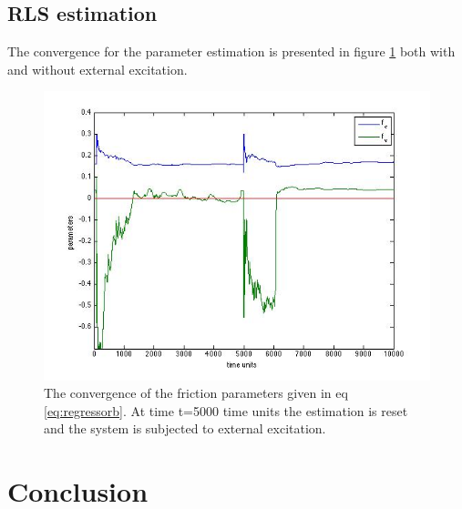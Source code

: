 \documentclass[10pt,a4paper]{article}
\begin{document}
\subsection{RLS estimation}
The convergence for the parameter estimation is presented in figure \ref{fig:rlsconv} both with and without external excitation.
\begin{figure}[H]
\centering
\includegraphics[scale=0.7]{plots/rlsconvergence.jpg}
\caption{The convergence of the friction parameters given in eq \ref{eq:regressorb}. At time t=5000 time units the estimation is reset and the system is subjected to external excitation.}
\label{fig:rlsconv}

\end{figure}


\section{Conclusion}
\end{document}

